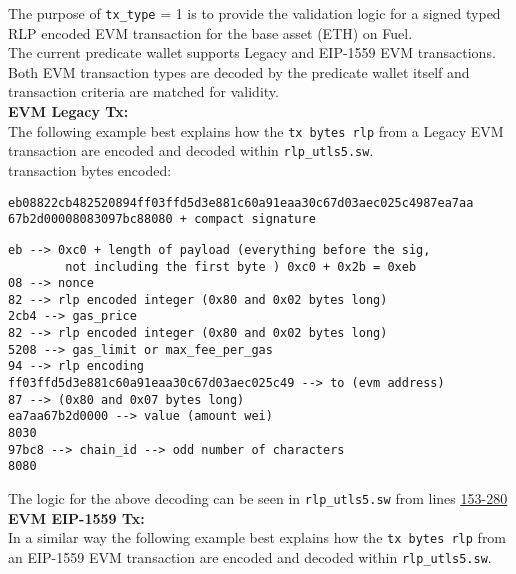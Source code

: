 The purpose of \texttt{tx\_type} = 1 is to provide the validation logic for a signed typed RLP encoded EVM transaction for the base asset (ETH) on Fuel.\\

The current predicate wallet supports Legacy and EIP-1559 EVM transactions. Both EVM transaction types are decoded by the predicate wallet itself and transaction
criteria are matched for validity.\\


\textbf{EVM Legacy Tx:} \\

The following example best explains how the \texttt{tx bytes rlp} from a Legacy EVM transaction are encoded and decoded within \texttt{rlp\_utls5.sw}.\\

transaction bytes encoded:\\
\begin{small}
    \begin{verbatim}
eb08822cb482520894ff03ffd5d3e881c60a91eaa30c67d03aec025c4987ea7aa
67b2d00008083097bc88080 + compact signature
    \end{verbatim}
\end{small}


\begin{small}
\begin{verbatim}
eb --> 0xc0 + length of payload (everything before the sig,
        not including the first byte ) 0xc0 + 0x2b = 0xeb
08 --> nonce
82 --> rlp encoded integer (0x80 and 0x02 bytes long)
2cb4 --> gas_price
82 --> rlp encoded integer (0x80 and 0x02 bytes long)
5208 --> gas_limit or max_fee_per_gas
94 --> rlp encoding
ff03ffd5d3e881c60a91eaa30c67d03aec025c49 --> to (evm address)
87 --> (0x80 and 0x07 bytes long)
ea7aa67b2d0000 --> value (amount wei)
8030
97bc8 --> chain_id --> odd number of characters
8080
\end{verbatim}
\end{small}


The logic for the above decoding can be seen in \texttt{rlp\_utls5.sw} from lines \href{https://github.com/Layer3Labs/zap-contracts/blob/9b2e0b8229077ef8becd6af0ad1a91f810a8db0a/contracts/wallet_predicate/src/rlp_utils5.sw#L153-L280}{\uline{153-280}}\\


\textbf{EVM EIP-1559 Tx:} \\

In a similar way the following example best explains how the \texttt{tx bytes rlp} from an EIP-1559 EVM transaction are encoded and decoded within \texttt{rlp\_utls5.sw}.\\

